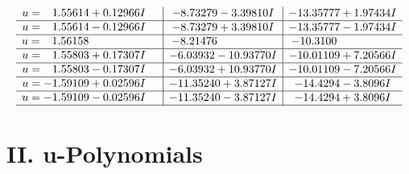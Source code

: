 \documentclass[1p]{elsarticle_modified}
\theoremstyle{definition}
\begin{document}
$$\begin{array}{c|c|c}
\begin{aligned}
u &= \phantom{-}1.55614 + 0.12966 I\end{aligned}
 & -8.73279 - 3.39810 I & -13.35777 + 1.97434 I \\ \hline\begin{aligned}
u &= \phantom{-}1.55614 - 0.12966 I\end{aligned}
 & -8.73279 + 3.39810 I & -13.35777 - 1.97434 I \\ \hline\begin{aligned}
u &= \phantom{-}1.56158\phantom{ +0.000000I}\end{aligned}
 & -8.21476\phantom{ +0.000000I} & -10.3100\phantom{ +0.000000I} \\ \hline\begin{aligned}
u &= \phantom{-}1.55803 + 0.17307 I\end{aligned}
 & -6.03932 - 10.93770 I & -10.01109 + 7.20566 I \\ \hline\begin{aligned}
u &= \phantom{-}1.55803 - 0.17307 I\end{aligned}
 & -6.03932 + 10.93770 I & -10.01109 - 7.20566 I \\ \hline\begin{aligned}
u &= -1.59109 + 0.02596 I\end{aligned}
 & -11.35240 + 3.87127 I & -14.4294 - 3.8096 I \\ \hline\begin{aligned}
u &= -1.59109 - 0.02596 I\end{aligned}
 & -11.35240 - 3.87127 I & -14.4294 + 3.8096 I\\
 \hline 
 \end{array}$$\newpage
\newpage\renewcommand{\arraystretch}{1}
\centering \section*{ II. u-Polynomials}
\end{document}
